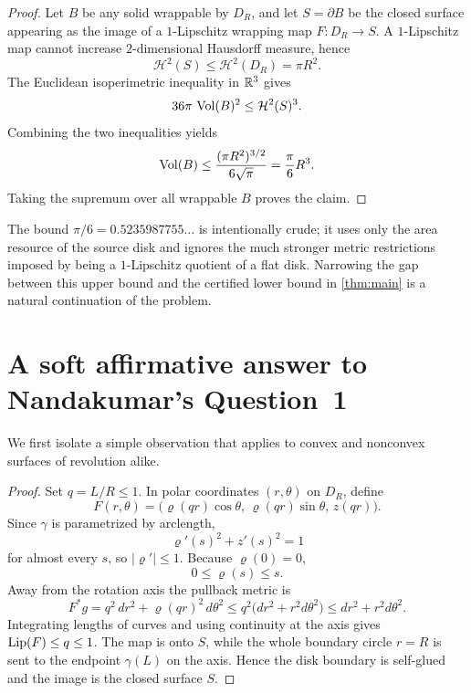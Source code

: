 \begin{proof}
Let $B$ be any solid wrappable by $D_R$, and let $S=\partial B$ be the closed surface appearing as the image of a $1$-Lipschitz wrapping map $F:D_R\to S$.  A $1$-Lipschitz map cannot increase $2$-dimensional Hausdorff measure, hence
\[
\mathcal H^2(S)\le \mathcal H^2(D_R)=\pi R^2.
\]
The Euclidean isoperimetric inequality in $\mathbb{R}^3$ gives
\[
36\pi\,\operatorname{Vol}(B)^2\le \mathcal H^2(S)^3.
\]
Combining the two inequalities yields
\[
\operatorname{Vol}(B)\le
\frac{(\pi R^2)^{3/2}}{6\sqrt\pi}
=\frac{\pi}{6}R^3.
\]
Taking the supremum over all wrappable $B$ proves the claim.
\end{proof}

The bound $\pi/6=0.5235987755\ldots$ is intentionally crude; it uses only the area resource of the source disk and ignores the much stronger metric restrictions imposed by being a $1$-Lipschitz quotient of a flat disk.  Narrowing the gap between this upper bound and the certified lower bound in \cref{thm:main} is a natural continuation of the problem.

\section{A soft affirmative answer to Nandakumar's Question~1}\label{sec:soft}
We first isolate a simple observation that applies to convex and nonconvex surfaces of revolution alike.


\begin{proof}
Set $q=L/R\le1$.  In polar coordinates $(r,\theta)$ on $D_R$, define
\[
F(r,\theta)=
\bigl(\varrho(qr)\cos\theta,\,\varrho(qr)\sin\theta,\,z(qr)\bigr).
\]
Since $\gamma$ is parametrized by arclength,
\[
\varrho'(s)^2+z'(s)^2=1
\]
for almost every $s$, so $|\varrho'|\le1$.  Because $\varrho(0)=0$,
\[
0\le\varrho(s)\le s.
\]
Away from the rotation axis the pullback metric is
\[
F^*g=q^2\,dr^2+\varrho(qr)^2\,d\theta^2
\le q^2\bigl(dr^2+r^2d\theta^2\bigr)
\le dr^2+r^2d\theta^2.
\]
Integrating lengths of curves and using continuity at the axis gives $\operatorname{Lip}(F)\le q\le1$.  The map is onto $S$, while the whole boundary circle $r=R$ is sent to the endpoint $\gamma(L)$ on the axis.  Hence the disk boundary is self-glued and the image is the closed surface $S$.
\end{proof}

